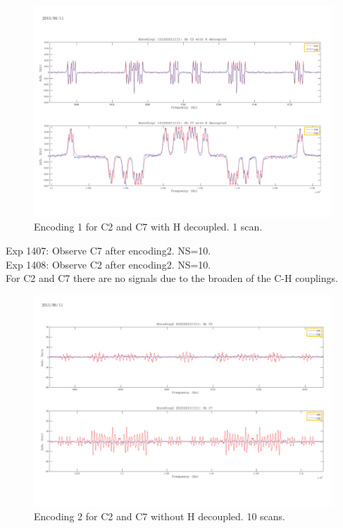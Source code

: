 \documentclass[prl,onecolumn]{revtex4-1}
\begin{document}
\begin{figure}[htb]
\begin{center}
\includegraphics[width=\columnwidth]{Encoding1_with_decouple.pdf}
\end{center}
\setlength{\abovecaptionskip}{-0.35cm}
\caption{\footnotesize{Encoding 1 for C2 and C7 with H decoupled. 1 scan.}}\label{1405and1406}
\end{figure}

\clearpage
Exp 1407: Observe C7 after encoding2. NS=10.\\
Exp 1408: Observe C2 after encoding2. NS=10.\\

For C2 and C7 there are no signals due to the broaden of the C-H couplings.

\begin{figure}[htb]
\begin{center}
\includegraphics[width=\columnwidth]{Encoding2_without_decouple.pdf}
\end{center}
\setlength{\abovecaptionskip}{-0.35cm}
\caption{\footnotesize{Encoding 2 for C2 and C7 without H decoupled. 10 scans.}}\label{1407and1408}
\end{figure}
\end{document}
